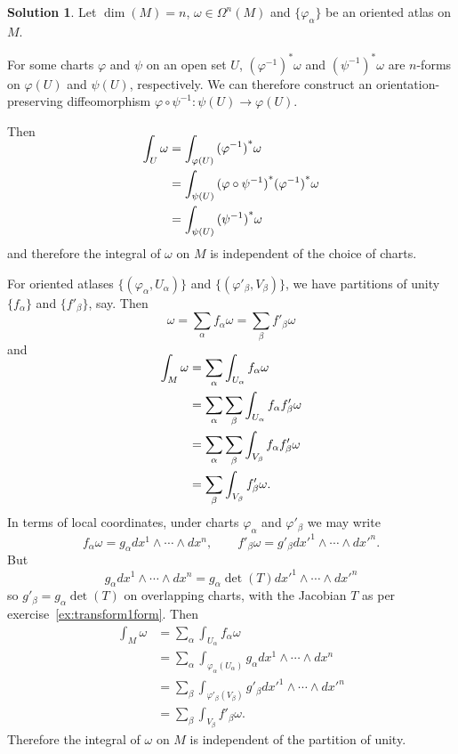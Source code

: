 \documentclass[11pt, a4paper]{report}
\theoremstyle{definition}
\newtheorem{sol}{Solution}[part]
\begin{document}
\begin{sol}


Let $\dim(M) = n$, $\omega \in \Omega^n(M)$ and $\{\varphi_\alpha\}$ be an oriented atlas on $M$.

For some charts $\varphi$ and $\psi$ on an open set $U$, ${(\varphi^{-1})}^* \omega$ and ${(\psi^{-1})}^* \omega$ are $n$-forms on $\varphi(U)$ and $\psi(U)$, respectively. We can therefore construct an orientation-preserving diffeomorphism $\varphi \circ \psi^{-1}: \psi(U) \to \varphi(U)$.

Then
\begin{align*}
    \SwapAboveDisplaySkip
    \int_U \omega &= \int_{\varphi(U)} {(\varphi^{-1})}^* \omega \\
                  &= \int_{\psi(U)} {(\varphi \circ \psi^{-1})}^* {(\varphi^{-1})}^* \omega \\
                  &= \int_{\psi(U)} {(\psi^{-1})}^* \omega
\end{align*}
and therefore the integral of $\omega$ on $M$ is independent of the choice of charts.

For oriented atlases $\{(\varphi_\alpha, U_\alpha)\}$ and $\{(\varphi'_\beta, V_\beta)\}$, we have partitions of unity $\{f_\alpha\}$ and $\{f'_\beta\}$, say. Then
\[
    \omega = \sum_\alpha f_\alpha \omega = \sum_\beta f'_\beta \omega
\]
and
\begin{align*}
    \SwapAboveDisplaySkip
    \int_M \omega &= \sum_\alpha \int_{U_\alpha} f_\alpha \omega \\
                  &= \sum_\alpha \sum_\beta \int_{U_\alpha} f_\alpha f'_\beta \omega \\
                  &= \sum_\alpha \sum_\beta \int_{V_\beta} f_\alpha f'_\beta \omega \\
                  &= \sum_\beta \int_{V_\beta} f'_\beta \omega.
\end{align*}
In terms of local coordinates, under charts $\varphi_\alpha$ and $\varphi'_\beta$ we may write
\[
    f_\alpha \omega = g_\alpha dx^1 \wedge \cdots \wedge dx^n, \qquad
    f'_\beta \omega = g'_\beta dx'^1 \wedge \cdots \wedge dx'^n.
\]
But
\[
    g_\alpha dx^1 \wedge \cdots \wedge dx^n = g_\alpha \det(T) dx'^1 \wedge \cdots \wedge dx'^n
\]
so $g'_\beta = g_\alpha \det(T)$ on overlapping charts, with the Jacobian $T$ as per exercise~\ref{ex:transform1form}.
Then
\begin{align*}
    \int_M \omega &= \sum_\alpha \int_{U_\alpha} f_\alpha \omega \\
        &= \sum_\alpha \int_{\varphi_\alpha(U_\alpha)} g_\alpha dx^1 \wedge \cdots \wedge dx^n \\
        &= \sum_\beta \int_{\varphi'_\beta(V_\beta)} g'_\beta dx'^1 \wedge \cdots \wedge dx'^n \\
        &= \sum_\beta \int_{V_\beta} f'_\beta \omega.
\end{align*}
Therefore the integral of $\omega$ on $M$ is independent of the partition of unity.

\end{sol}
\end{document}
